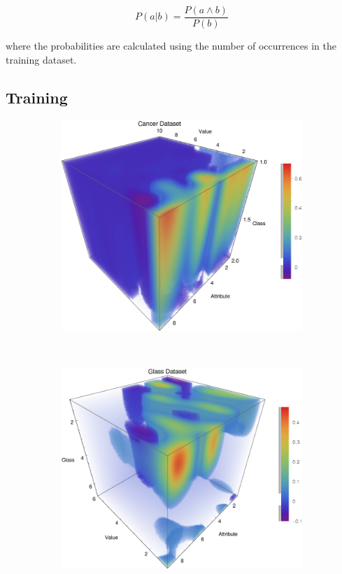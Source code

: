 \documentclass{article}
\begin{document}
	\begin{equation*}
		P(a|b) = \frac{P(a \land b)}{P(b)}
	\end{equation*}
	
	where the probabilities are calculated using the number of occurrences in the training dataset. 

	\subsection{Training}
		\label{nb_train}
		
		\begin{figure}[h!]
			\centering
			\begin{subfigure}[b]{0.4\textwidth}
				\centering
				\includegraphics[width=\textwidth]{figs/NaiveBayes/plot_ptable_cancer}	
				\caption{}
				\label{p_cancer}				
			\end{subfigure}	\	
			\begin{subfigure}[b]{0.4\textwidth}
				\centering
				\includegraphics[width=\textwidth]{figs/NaiveBayes/plot_ptable_glass}

\end{subfigure}
\end{figure}
\end{document}
